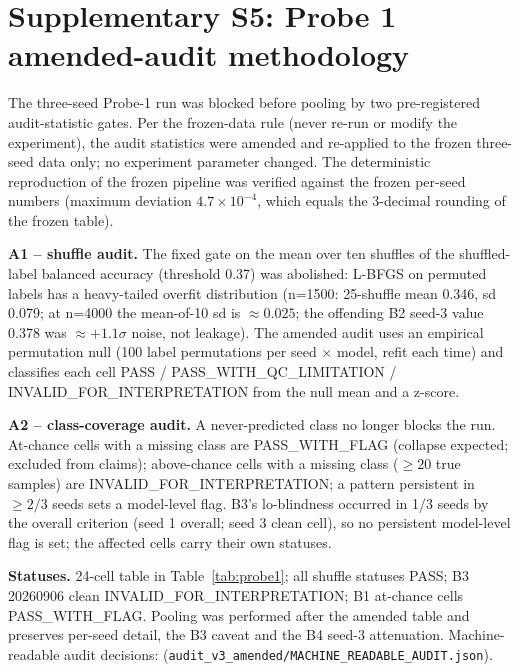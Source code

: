 \section{Supplementary S5: Probe 1 amended-audit methodology}

The three-seed Probe-1 run was blocked before pooling by two
pre-registered audit-statistic gates.  Per the frozen-data rule (never
re-run or modify the experiment), the audit statistics were amended and
re-applied to the frozen three-seed data only; no experiment parameter
changed.  The deterministic reproduction of the frozen pipeline was
verified against the frozen per-seed numbers (maximum deviation
$4.7\times10^{-4}$, which equals the 3-decimal rounding of the frozen
table).

\textbf{A1 -- shuffle audit.} The fixed gate on the mean over ten
shuffles of the shuffled-label balanced accuracy (threshold 0.37) was
abolished: L-BFGS on permuted labels
has a heavy-tailed overfit distribution (n=1500: 25-shuffle mean 0.346,
sd 0.079; at n=4000 the mean-of-10 sd is $\approx 0.025$; the offending
B2 seed-3 value 0.378 was $\approx +1.1\sigma$ noise, not leakage).  The
amended audit uses an empirical permutation null (100 label
permutations per seed $\times$ model, refit each time) and classifies
each cell PASS / PASS\_\allowbreak{}WITH\_\allowbreak{}QC\_\allowbreak{}LIMITATION /
INVALID\_\allowbreak{}FOR\_\allowbreak{}INTERPRETATION from the null mean and a z-score.

\textbf{A2 -- class-coverage audit.} A never-predicted class no longer
blocks the run.  At-chance cells with a missing class are
PASS\_\allowbreak{}WITH\_\allowbreak{}FLAG (collapse expected; excluded from claims); above-chance
cells with a missing class ($\geq 20$ true samples) are
INVALID\_\allowbreak{}FOR\_\allowbreak{}INTERPRETATION; a pattern persistent in $\geq 2/3$ seeds
sets a model-level flag.  B3's lo-blindness occurred in 1/3 seeds by the
overall criterion (seed 1 overall; seed 3 clean cell), so no persistent
model-level flag is set; the affected cells carry their own statuses.

\textbf{Statuses.} 24-cell table in Table~\ref{tab:probe1}; all shuffle
statuses PASS; B3 20260906 clean INVALID\_\allowbreak{}FOR\_\allowbreak{}INTERPRETATION; B1
at-chance cells PASS\_\allowbreak{}WITH\_\allowbreak{}FLAG.  Pooling was performed after the
amended table and preserves per-seed detail, the B3 caveat and the B4
seed-3 attenuation.  Machine-readable audit decisions:
(\texttt{audit\_\allowbreak{}v3\_\allowbreak{}amended/MACHINE\_\allowbreak{}READABLE\_\allowbreak{}AUDIT.json}).
